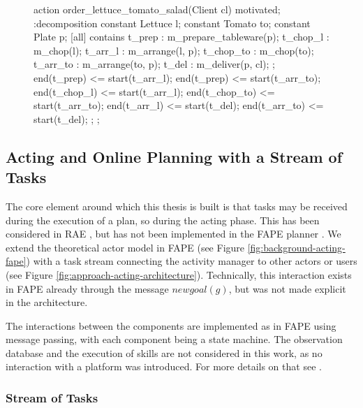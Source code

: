\begin{figure}
  \begin{anmlcode}
  action order_lettuce_tomato_salad(Client cl) {
    motivated;
    :decomposition {
      constant Lettuce l;
      constant Tomato to;
      constant Plate p;
      [all] contains {
        t_prep : m_prepare_tableware(p);
        t_chop_l : m_chop(l);
        t_arr_l : m_arrange(l, p);
        t_chop_to : m_chop(to);
        t_arr_to : m_arrange(to, p);
        t_del : m_deliver(p, cl);
      };
      end(t_prep) <= start(t_arr_l);
      end(t_prep) <= start(t_arr_to);
      end(t_chop_l) <= start(t_arr_l);
      end(t_chop_to) <= start(t_arr_to);
      end(t_arr_l) <= start(t_del);
      end(t_arr_to) <= start(t_del);
    };
  };
  \end{anmlcode}
  \label{lst:approach-order}
\end{figure}

\subsection{Acting and Online Planning with a Stream of Tasks}
\label{sec:approach-acting}

The core element around which this thesis is built is that tasks may be received during the execution of a plan, so during the acting phase.
This has been considered in \ac{RAE} \citep{ghallabAutomatedPlanningActing2016}, but has not been implemented in the \ac{FAPE} planner \citep{bit-monnotTemporalHierarchicalModels2016a}.
We extend the theoretical actor model in \ac{FAPE} (see Figure \ref{fig:background-acting-fape}) with a task stream connecting the activity manager to other actors or users (see Figure \ref{fig:approach-acting-architecture}).
Technically, this interaction exists in \ac{FAPE} already through the message $newgoal(g)$, but was not made explicit in the architecture.



The interactions between the components are implemented as in \ac{FAPE} using message passing, with each component being a state machine.
The observation database and the execution of skills are not considered in this work, as no interaction with a platform was introduced.
For more details on that see \cite{bit-monnotTemporalHierarchicalModels2016a}.

\subsubsection{Stream of Tasks}

